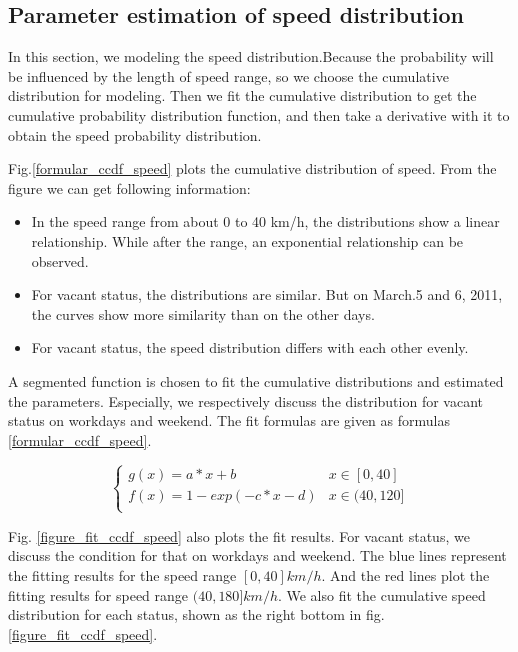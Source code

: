 \subsection{Parameter estimation of speed distribution}
\label{section_speed_modeling}
In this section, we modeling the speed distribution.Because the probability will be influenced by the length of speed range, so we choose the cumulative distribution for modeling. Then we fit the cumulative distribution to get the cumulative probability distribution function, and then take a derivative with it to obtain the speed probability distribution.

Fig.\ref{formular_ccdf_speed} plots the cumulative distribution of speed. From the figure we can get following information:
\begin{itemize}
  \item In the speed range from about 0 to 40 km/h, the distributions show a linear relationship. While after the range, an exponential relationship can be observed.
  \item For vacant status, the distributions are similar. But on March.5 and 6, 2011, the curves show more similarity than on the other days.
  \item For vacant status, the speed distribution differs with each other evenly.
\end{itemize}

 A segmented function is chosen to fit the cumulative distributions and estimated the parameters. Especially, we respectively discuss the distribution for vacant status on workdays and weekend.
The fit formulas are given as formulas \ref{formular_ccdf_speed}.

\begin{equation}\label{formular_ccdf_speed}
\left\{
\begin{array}{ll}
 g(x)=a*x+b & x \in [0,40]\\
 f(x)=1-exp(-c*x-d)& x\in(40,120]\\
\end{array}
\right.
\end{equation}


Fig. \ref{figure_fit_ccdf_speed} also plots the fit results. For vacant status, we discuss the condition for that on workdays and weekend. The blue lines represent the fitting results for the speed range $[0,40] km/h$. And the red lines plot the fitting results for speed range $(40,180] km/h$.
We also fit the cumulative speed distribution for each status, shown as the right bottom in fig.\ref{figure_fit_ccdf_speed}.


